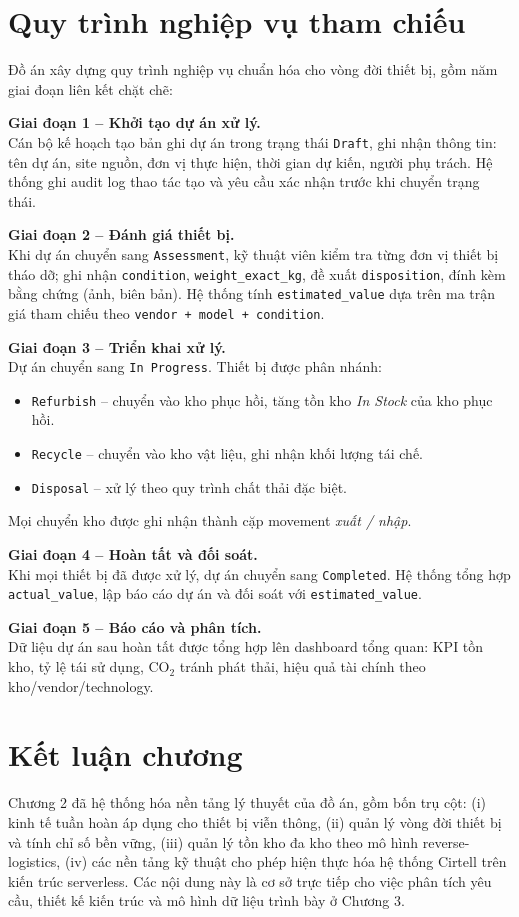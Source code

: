 \section{Quy trình nghiệp vụ tham chiếu}
\label{sec:bpm}
Đồ án xây dựng quy trình nghiệp vụ chuẩn hóa cho vòng đời thiết bị, gồm năm giai đoạn liên kết chặt chẽ:


\textbf{Giai đoạn 1 -- Khởi tạo dự án xử lý.}\\
Cán bộ kế hoạch tạo bản ghi dự án trong trạng thái \texttt{Draft}, ghi nhận thông tin: tên dự án, site nguồn, đơn vị thực hiện, thời gian dự kiến, người phụ trách. Hệ thống ghi audit log thao tác tạo và yêu cầu xác nhận trước khi chuyển trạng thái.

\textbf{Giai đoạn 2 -- Đánh giá thiết bị.}\\
Khi dự án chuyển sang \texttt{Assessment}, kỹ thuật viên kiểm tra từng đơn vị thiết bị tháo dỡ; ghi nhận \texttt{condition}, \texttt{weight\_exact\_kg}, đề xuất \texttt{disposition}, đính kèm bằng chứng (ảnh, biên bản). Hệ thống tính \texttt{estimated\_value} dựa trên ma trận giá tham chiếu theo \texttt{vendor + model + condition}.

\textbf{Giai đoạn 3 -- Triển khai xử lý.}\\
Dự án chuyển sang \texttt{In Progress}. Thiết bị được phân nhánh:
\begin{itemize}[leftmargin=1.2cm]
    \item \texttt{Refurbish} -- chuyển vào kho phục hồi, tăng tồn kho \emph{In Stock} của kho phục hồi.
    \item \texttt{Recycle} -- chuyển vào kho vật liệu, ghi nhận khối lượng tái chế.
    \item \texttt{Disposal} -- xử lý theo quy trình chất thải đặc biệt.
\end{itemize}
Mọi chuyển kho được ghi nhận thành cặp movement \emph{xuất / nhập}.

\textbf{Giai đoạn 4 -- Hoàn tất và đối soát.}\\
Khi mọi thiết bị đã được xử lý, dự án chuyển sang \texttt{Completed}. Hệ thống tổng hợp \texttt{actual\_value}, lập báo cáo dự án và đối soát với \texttt{estimated\_value}.

\textbf{Giai đoạn 5 -- Báo cáo và phân tích.}\\
Dữ liệu dự án sau hoàn tất được tổng hợp lên dashboard tổng quan: KPI tồn kho, tỷ lệ tái sử dụng, CO$_2$ tránh phát thải, hiệu quả tài chính theo kho/vendor/technology.

\section{Kết luận chương}
Chương 2 đã hệ thống hóa nền tảng lý thuyết của đồ án, gồm bốn trụ cột: (i) kinh tế tuần hoàn áp dụng cho thiết bị viễn thông, (ii) quản lý vòng đời thiết bị và tính chỉ số bền vững, (iii) quản lý tồn kho đa kho theo mô hình reverse-logistics, (iv) các nền tảng kỹ thuật cho phép hiện thực hóa hệ thống Cirtell trên kiến trúc serverless. Các nội dung này là cơ sở trực tiếp cho việc phân tích yêu cầu, thiết kế kiến trúc và mô hình dữ liệu trình bày ở Chương 3.
